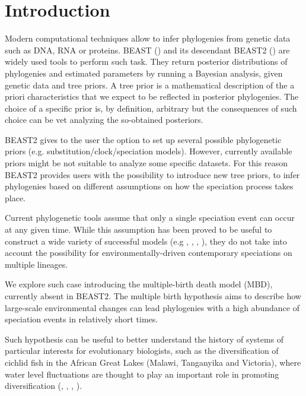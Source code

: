 \section{Introduction}

Modern computational techniques allow to infer phylogenies from genetic data 
such as DNA, RNA or proteins. BEAST (\cite{beast}) and its descendant 
BEAST2 (\cite{beast2}) are widely used tools to perform such task. They 
return posterior distributions of phylogenies and estimated parameters by running a Bayesian analysis, given genetic data and tree priors. A tree prior is a mathematical description of the a priori characteristics that we expect to be reflected in posterior phylogenies. The choice of a specific prior is, by definition, arbitrary but the consequences of such choice can be vet analyzing the so-obtained posteriors.

BEAST2 gives to the user the option to set up several possible phylogenetic priors (e.g. substitution/clock/speciation models). However, currently available priors might be not suitable to analyze some specific datasets.
For this reason BEAST2 provides users with the possibility to introduce new tree priors, to infer phylogenies based on different assumptions on how the speciation process takes place.

Current phylogenetic tools assume that only a single speciation event can occur at any given time.
While this assumption has been proved to be useful to construct a wide variety of successful models (e.g \cite{Maddison2007biSSE}, \cite{Valente2015}, \cite{etienne2012diversity}, \cite{etienne2014estimating}), they do not take into account the possibility for environmentally-driven contemporary speciations on multiple lineages.

We explore such case introducing the multiple-birth death model (MBD), 
currently absent in BEAST2. 
The multiple birth hypothesis aims to describe how 
large-scale environmental changes can lead phylogenies 
with a high abundance of speciation events in relatively short times.

\iffalse
\giovanni{This might be good for the abstract}
The (constant-rate) birth-death (BD) model embodies the common assumption 
that only a single speciation event can occur at any given time. 
The multiple-birth-death (MBD) model relaxes this assumption allowing, 
in addition to standard BD events, 
also events in which large-scale environmental changes lead 
to speciation bursts.
\fi

Such hypothesis can be useful to better understand the history of systems of particular interests for evolutionary biologists, such as the diversification of cichlid fish in the African Great Lakes (Malawi, Tanganyika and Victoria), where water level fluctuations are thought to play an important role in promoting diversification (\citep{verheyen1996mitochondrial}, \citep{sturmbauer2001lake}, \citep{janzen2016}, \citep{janzen2017}).

